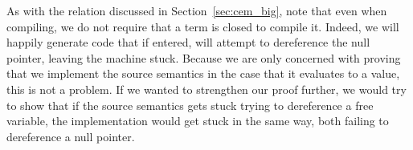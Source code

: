 As with the relation discussed in Section~\ref{sec:cem_big}, note that even when
compiling, we do not require that a term is closed to compile it. Indeed, we
will happily generate code that if entered, will attempt to dereference the null
pointer, leaving the machine stuck. Because we are only concerned with proving
that we implement the source semantics in the case that it evaluates to a value,
this is not a problem. If we wanted to strengthen our proof further, we would
try to show that if the source semantics gets stuck trying to dereference a free
variable, the implementation would get stuck in the same way, both failing to
dereference a null pointer.    
